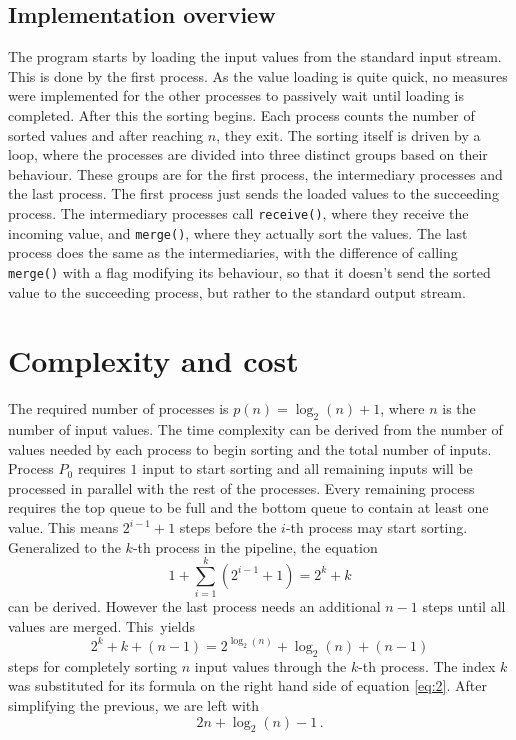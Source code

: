 \documentclass[pdftex, 11pt, a4paper, titlepage]{article}
\begin{document}
        \subsection{Implementation overview}
        The program starts by loading the input values from the standard input stream. This is done by the first process.
        As the value loading is quite quick, no measures were implemented for the other processes to passively wait
        until loading is completed. After this the sorting begins. Each process counts the number of sorted values and after reaching
        $n$, they exit. The sorting itself is driven by a loop, where the processes are divided into three distinct groups based on
        their behaviour. These groups are for the first process, the intermediary processes and the last process. The first process
        just sends the loaded values to the succeeding process. The intermediary processes call \texttt{receive()}, where they receive
        the incoming value, and \texttt{merge()}, where they actually sort the values. The last process does the same as the intermediaries,
        with the difference of calling \texttt{merge()} with a flag modifying its behaviour, so that it doesn't send the sorted value
        to the succeeding process, but rather to the standard output stream.

        \section{Complexity and cost}
        The required number of processes is $p(n) = \log_{2}(n)+1$, where $n$ is the number of input values. The time complexity
        can be derived from the number of values needed by each process to begin sorting and the total number of inputs.
        Process $P_0$ requires $1$ input to start sorting and all remaining inputs will be processed in parallel with the rest
        of the processes. Every remaining process requires the top queue to be full and the bottom queue to contain at least one value.
        This means $2^{i-1} + 1$ steps before the $i$-th process may start sorting. Generalized to the $k$-th process in the pipeline,
        the equation
        \begin{equation}\label{eq:1}
            1 + \sum_{i=1}^{k}(2^{i-1}+1) = 2^{k} + k
        \end{equation}
        can be derived. However the last process needs an additional $n-1$ steps until all values are merged. This~yields
        \begin{equation}\label{eq:2}
            2^{k} + k + (n-1) = 2^{\log_{2}(n)} + \log_{2}(n) + (n-1)
        \end{equation}
        steps for completely sorting $n$ input values through the $k$-th process. The index $k$ was substituted for its formula
        on the right hand side of equation \ref{eq:2}. After simplifying the previous, we are left with
        \begin{equation}\label{eq:3}
            2n + \log_{2}(n) - 1\,.
        \end{equation}
\end{document}
